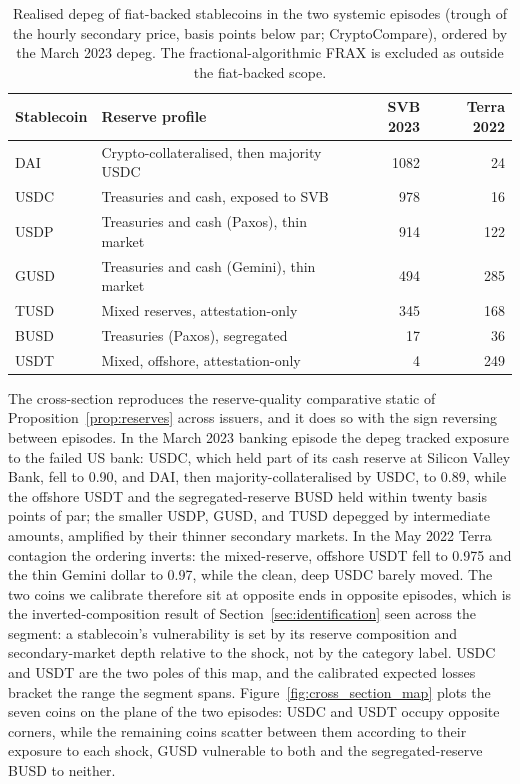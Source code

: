 \begin{table}[H]
\centering
\caption{Realised depeg of fiat-backed stablecoins in the two systemic episodes (trough of the hourly secondary price, basis points below par; CryptoCompare), ordered by the March 2023 depeg. The fractional-algorithmic FRAX is excluded as outside the fiat-backed scope.}\label{tab:cross_section}
\begin{tabular}{llrr}
\toprule
Stablecoin & Reserve profile & SVB 2023 & Terra 2022 \\
\midrule
DAI  & Crypto-collateralised, then majority USDC & 1082 & 24 \\
USDC & Treasuries and cash, exposed to SVB        & 978  & 16 \\
USDP & Treasuries and cash (Paxos), thin market   & 914  & 122 \\
GUSD & Treasuries and cash (Gemini), thin market  & 494  & 285 \\
TUSD & Mixed reserves, attestation-only           & 345  & 168 \\
BUSD & Treasuries (Paxos), segregated             & 17   & 36 \\
USDT & Mixed, offshore, attestation-only          & 4    & 249 \\
\bottomrule
\end{tabular}
\end{table}

The cross-section reproduces the reserve-quality comparative static of Proposition~\ref{prop:reserves} across issuers, and it does so with the sign reversing between episodes. In the March 2023 banking episode the depeg tracked exposure to the failed US bank: USDC, which held part of its cash reserve at Silicon Valley Bank, fell to 0.90, and DAI, then majority-collateralised by USDC, to 0.89, while the offshore USDT and the segregated-reserve BUSD held within twenty basis points of par; the smaller USDP, GUSD, and TUSD depegged by intermediate amounts, amplified by their thinner secondary markets. In the May 2022 Terra contagion the ordering inverts: the mixed-reserve, offshore USDT fell to 0.975 and the thin Gemini dollar to 0.97, while the clean, deep USDC barely moved. The two coins we calibrate therefore sit at opposite ends in opposite episodes, which is the inverted-composition result of Section~\ref{sec:identification} seen across the segment: a stablecoin's vulnerability is set by its reserve composition and secondary-market depth relative to the shock, not by the category label. USDC and USDT are the two poles of this map, and the calibrated expected losses bracket the range the segment spans. Figure~\ref{fig:cross_section_map} plots the seven coins on the plane of the two episodes: USDC and USDT occupy opposite corners, while the remaining coins scatter between them according to their exposure to each shock, GUSD vulnerable to both and the segregated-reserve BUSD to neither.

